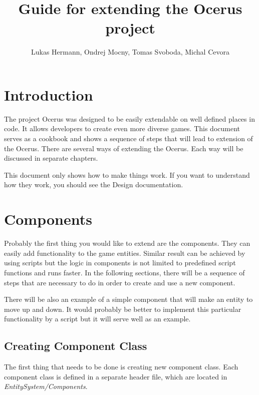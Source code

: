\documentclass[a4paper, 12pt]{report}
\begin{document}
\pagestyle{empty} %

\title{Guide for extending the Ocerus project}
\author{Lukas Hermann, Ondrej Mocny, Tomas Svoboda, Michal Cevora}

\pagestyle{plain} %

\tableofcontents %
\cleardoublepage %

\chapter{Introduction}

The project Ocerus was designed to be easily extendable on well defined places in code. It allows developers to create even more diverse games. This document serves as a cookbook and shows a sequence of steps that will lead to extension of the Ocerus. There are several ways of extending the Ocerus. Each way will be discussed in separate chapters.

This document only shows how to make things work. If you want to understand how they work, you should see the Design documentation.

\chapter{Components}

Probably the first thing you would like to extend are the components. They can easily add functionality to the game entities. Similar result can be achieved by using scripts but the logic in components is not limited to predefined script functions and runs faster. In the following sections, there will be a sequence of steps that are necessary to do in order to create and use a new component. 

There will be also an example of a simple component that will make an entity to move up and down. It would probably be better to implement this particular functionality by a script but it will serve well as an example.

\section{Creating Component Class}
The first thing that needs to be done is creating new component class. Each component class is defined in a separate header file, which are located in \emph{EntitySystem/Components}.
\end{document}

